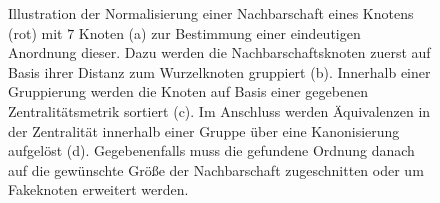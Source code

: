 \begin{figure}[t]
{
}
\caption[Normalisierung]{Illustration der Normalisierung einer Nachbarschaft eines Knotens (rot) mit $7$ Knoten (a) zur Bestimmung einer eindeutigen Anordnung dieser.
Dazu werden die Nachbarschaftsknoten zuerst auf Basis ihrer Distanz zum Wurzelknoten gruppiert (b).
Innerhalb einer Gruppierung werden die Knoten auf Basis einer gegebenen Zentralitätsmetrik sortiert (c).
Im Anschluss werden Äquivalenzen in der Zentralität innerhalb einer Gruppe über eine Kanonisierung aufgelöst (d).
Gegebenenfalls muss die gefundene Ordnung danach auf die gewünschte Größe der Nachbarschaft zugeschnitten oder um Fakeknoten erweitert werden.}
\label{fig:raeumliche_faltung}
\end{figure}
